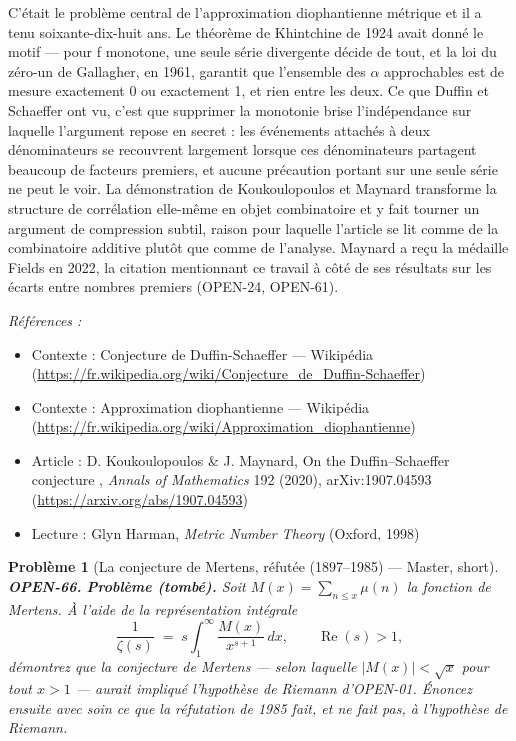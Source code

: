 \documentclass[11pt]{article}
\newtheorem{problem}{Problème}
\newenvironment{refs}{\par\small\noindent\emph{Références :}\begin{itemize}\setlength\itemsep{0pt}}{\end{itemize}\normalsize}
\begin{document}
\noindent C'était le problème central de l'approximation diophantienne métrique et
il a tenu soixante-dix-huit ans. Le théorème de Khintchine de 1924 avait donné le motif ---
pour f monotone, une seule série divergente décide de tout, et la loi du zéro-un de
Gallagher, en 1961, garantit que l'ensemble des $\alpha$ approchables est de mesure exactement 0
ou exactement 1, et rien entre les deux. Ce que Duffin et Schaeffer ont vu, c'est que
supprimer la monotonie brise l'indépendance sur laquelle l'argument repose en secret : les
événements attachés à deux dénominateurs se recouvrent largement lorsque ces dénominateurs
partagent beaucoup de facteurs premiers, et aucune précaution portant sur une seule série
ne peut le voir. La démonstration de Koukoulopoulos et Maynard transforme la structure de
corrélation elle-même en objet combinatoire et y fait tourner un argument de compression
subtil, raison pour laquelle l'article se lit comme de la combinatoire additive plutôt que
comme de l'analyse. Maynard a reçu la médaille Fields en 2022, la citation mentionnant ce
travail à côté de ses résultats sur les écarts entre nombres premiers (OPEN-24,
OPEN-61).

\begin{refs}
\item Contexte : Conjecture de Duffin-Schaeffer --- Wikipédia (\url{https://fr.wikipedia.org/wiki/Conjecture_de_Duffin-Schaeffer})
\item Contexte : Approximation diophantienne --- Wikipédia (\url{https://fr.wikipedia.org/wiki/Approximation_diophantienne})
\item Article : D. Koukoulopoulos \& J. Maynard, \og{} On the Duffin--Schaeffer conjecture \fg{}, \textit{Annals of Mathematics} 192 (2020), arXiv:1907.04593 (\url{https://arxiv.org/abs/1907.04593})
\item Lecture : Glyn Harman, \textit{Metric Number Theory} (Oxford, 1998)
\end{refs}

\bigskip

\begin{problem}[{La conjecture de Mertens, réfutée (1897--1985) --- Master, short}]
\textbf{OPEN-66.} \textbf{Problème (tombé).} Soit $ M(x) = \sum_{n \le x} \mu(n) $ la
fonction de Mertens. À l'aide de la représentation intégrale
\[ \frac{1}{\zeta(s)} \;=\; s \int_{1}^{\infty} \frac{M(x)}{x^{s+1}} \, dx,
\qquad \operatorname{Re}(s) > 1, \]
démontrez que la conjecture de Mertens --- selon laquelle $ |M(x)| < \sqrt{x} $ pour tout
$ x > 1 $ --- aurait impliqué l'hypothèse de Riemann d'OPEN-01. Énoncez ensuite avec soin
ce que la réfutation de 1985 fait, et ne fait pas, à l'hypothèse de Riemann.
\end{problem}
\end{document}
